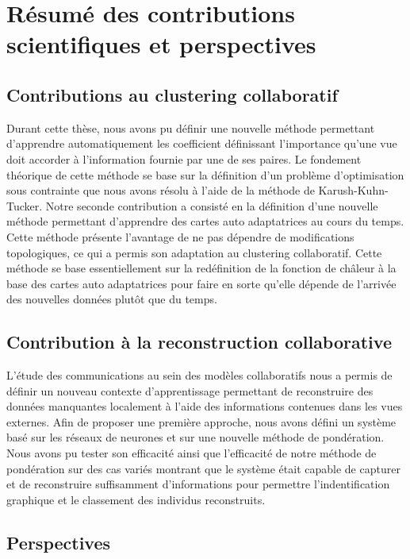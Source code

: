 \documentclass[a4paper]{article}
\begin{document}
\section{Résumé des contributions scientifiques et perspectives}

\subsection{Contributions au clustering collaboratif}

Durant cette thèse, nous avons pu définir une nouvelle méthode permettant d'apprendre automatiquement les coefficient définissant l'importance qu'une vue doit accorder à l'information fournie par une de ses paires. Le fondement théorique de cette méthode se base sur la définition d'un problème d'optimisation sous contrainte que nous avons résolu à l'aide de la méthode de Karush-Kuhn-Tucker.
Notre seconde contribution a consisté en la définition d'une nouvelle méthode permettant d'apprendre des cartes auto adaptatrices au cours du temps. Cette méthode présente l'avantage de ne pas dépendre de modifications topologiques, ce qui a permis son adaptation au clustering collaboratif. Cette méthode se base essentiellement sur la redéfinition de la fonction de châleur à la base des cartes auto adaptatrices pour faire en sorte qu'elle dépende de l'arrivée des nouvelles données plutôt que du temps.

\subsection{Contribution à la reconstruction collaborative}

L'étude des communications au sein des modèles collaboratifs nous a permis de définir un nouveau contexte d'apprentissage permettant de reconstruire des données manquantes localement à l'aide des informations contenues dans les vues externes. Afin de proposer une première approche, nous avons défini un système basé sur les réseaux de neurones et sur une nouvelle méthode de pondération. Nous avons pu tester son efficacité ainsi que l'efficacité de notre méthode de pondération sur des cas variés montrant que le système était capable de capturer et de reconstruire suffisamment d'informations pour permettre l'indentification graphique et le classement des individus reconstruits.

\subsection{Perspectives}
\end{document}
